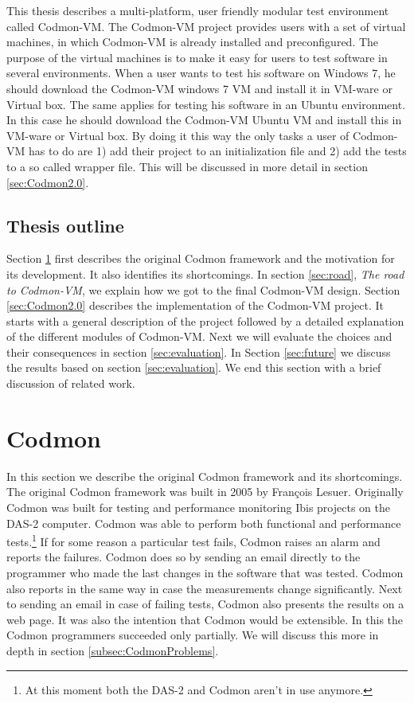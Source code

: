 \documentclass{article}
\newcommand{\project}{Codmon-VM}
\begin{document}
\noindent This thesis describes a multi-platform, user friendly modular test environment called \project{}. The \project{} project provides users with a set of virtual machines,
in which \project{} is already installed and preconfigured. The purpose of the virtual machines is to make it easy for users to test software in several environments.  When a user wants to 
test his software on Windows 7, he should download the \project{} windows 7 VM and install it in VM-ware or Virtual box. The same applies for testing his software in an Ubuntu environment. In this case he should 
download the \project{} Ubuntu VM and install this in VM-ware or Virtual box. By doing it this way the  only tasks a user of \project{} has to do are 1) add their project to an initialization file and 2) add 
the tests to a so called wrapper file. This will be discussed in more detail in section \ref{sec:Codmon2.0}.


\subsection{Thesis outline}
\label{subsec:Thesisoutline}
Section \ref{sec:codmon} first describes the original Codmon framework and the motivation for its development. It also identifies its shortcomings. In section \ref{sec:road}, \emph{The road to \project{}}, 
we explain how we got to the final \project{} design. Section \ref{sec:Codmon2.0} describes the implementation of the \project{} project. 
It starts with a general description of the project followed by a detailed explanation of the different modules of \project{}. Next we will evaluate the choices and their consequences 
in section \ref{sec:evaluation}. In Section \ref{sec:future} we discuss the results based on section \ref{sec:evaluation}. We end this section with a brief discussion of related work.

\newpage
\section{Codmon}
\label{sec:codmon}
In this section we describe the original Codmon framework and its shortcomings. The original Codmon framework was built in 2005 by François Lesuer\cite{Codmon}. Originally Codmon was built for 
testing and performance monitoring Ibis projects\cite{Ibis} \cite{Satin}\cite{MPJ}\cite{IPL}\cite{GMI} on the DAS-2\cite{das2} computer. Codmon was able to perform both functional and performance tests.\footnote{At 
this moment both the DAS-2 and Codmon aren't in use anymore.} If for some reason a particular test fails, Codmon raises an alarm and reports the failures. Codmon does so by 
sending an email directly to the programmer who made the last changes in the software that was tested. Codmon also reports in the same way in case the measurements change significantly. 
Next to sending an email in case of failing tests, Codmon also presents the results on a web page. It was also the intention that Codmon would be extensible. In this the Codmon programmers 
succeeded only partially. We will discuss this more in depth in section \ref{subsec:CodmonProblems}.  
\end{document}
